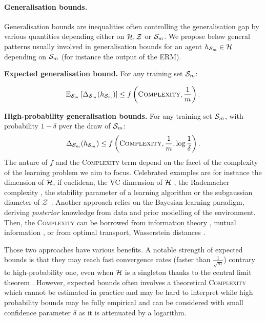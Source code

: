 \paragraph{Generalisation bounds.} Generalisation bounds are inequalities often controlling the generalisation gap by various quantities depending either on $\H,\Z$ or $\S_m$. We propose below general patterns usually involved in generalisation bounds for an agent $h_{\Sm}\in\H$ depending on $\S_m$ (for instance the output of the ERM). 

\textbf{Expected generalisation bound.} For any training set $\S_m$:

\begin{align} 
  \label{eq: expected-bound}
  \mathbb{E}_{\S_m}\LB \Delta_{\Sm}(h_{\Sm}) \RB \leq f\LP \textsc{Complexity}, \frac{1}{m}\RP. 
\end{align}

\textbf{High-probability generalisation bounds.} For any training set $\S_m$, with probability $1-\delta$ pver the draw of $\Sm$:
\begin{align}
  \label{eq: hp-bound}
  \Delta_{\Sm}(h_{\Sm}) \leq f\LP \textsc{Complexity}, \frac{1}{m}, \log\frac{1}{\delta}\RP.
\end{align}
The nature of $f$ and the \textsc{Complexity} term depend on the facet of the complexity of the learning problem we aim to focus. Celebrated examples are for instance the dimension of $\H$, if euclidean, the VC dimension of $\H$ \citep{vapnik2000learning}, the Rademacher complexity \citep{bartlett2001rademacher,bartlett2002rademacher},  the stability parameter of a learning algorithm \citep{bousquet2000algo} or the subgaussian diameter of $\Z$ \citep{kontorovich2014conc}. 
Another approach relies on the Bayesian learning paradigm, deriving \emph{posterior} knowledge from data and prior modelling of the environment. 
Then, the \textsc{Complexity} can be borrowed from information theory \citep{cover2001elements}, \eg mutual information \citep{neal2012bayesian}, or from optimal transport, \eg Wasserstein distances \citep{wang2019information,rodriguez2021tighter}. 

Those two approaches have various benefits. A notable strength of expected bounds is that they may reach fast convergence rates (\ie faster than $\frac{1}{\sqrt{m}}$) contrary to high-probability one, even when $\H$ is a singleton thanks to the central limit theorem \citep{grunwald2021mac}. However, expected bounds often involves a theoretical \textsc{Complexity} which cannot be estimated in practice and may be hard to interpret while high probability bounds may be fully empirical and can be considered with small confidence parameter $\delta$ as it is attenuated by a logarithm.

